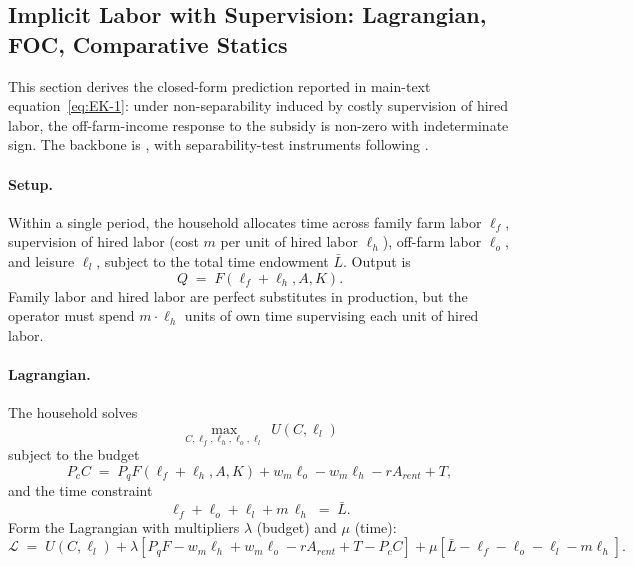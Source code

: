 \documentclass[11pt, a4paper]{article}
\begin{document}
\subsection{Implicit Labor with Supervision: Lagrangian, FOC, Comparative Statics}
\label{sec:appB-supervision}

This section derives the closed-form prediction reported in main-text
equation~\ref{eq:EK-1}: under non-separability induced by costly supervision of
hired labor, the off-farm-income response to the subsidy is non-zero with
indeterminate sign. The backbone is \citet{EswaranKotwal1986_supervision}, with
separability-test instruments following \citet{Benjamin1992_separation}.

\paragraph{Setup.} Within a single period, the household allocates time across
family farm labor $\ell_f$, supervision of hired labor (cost $m$ per unit of
hired labor $\ell_h$), off-farm labor $\ell_o$, and leisure $\ell_l$, subject to
the total time endowment $\bar L$. Output is
\begin{equation}
Q \;=\; F(\ell_f + \ell_h, A, K).
\label{eq:appB-EK-prod}
\end{equation}
Family labor and hired labor are perfect substitutes in production, but the
operator must spend $m \cdot \ell_h$ units of own time supervising each unit of
hired labor.

\paragraph{Lagrangian.} The household solves
\begin{equation}
\max_{C, \ell_f, \ell_h, \ell_o, \ell_l} \; U(C, \ell_l)
\label{eq:appB-EK-objective}
\end{equation}
subject to the budget
\begin{equation}
P_c C \;=\; P_q F(\ell_f + \ell_h, A, K) + w_m \ell_o - w_m \ell_h - r A_{rent} + T,
\label{eq:appB-EK-budget}
\end{equation}
and the time constraint
\begin{equation}
\ell_f + \ell_o + \ell_l + m\, \ell_h \;=\; \bar L.
\label{eq:appB-EK-time}
\end{equation}
Form the Lagrangian with multipliers $\lambda$ (budget) and $\mu$ (time):
\begin{equation}
\mathcal{L} \;=\; U(C, \ell_l) + \lambda \left[P_q F - w_m \ell_h + w_m \ell_o - r A_{rent} + T - P_c C\right] + \mu \left[\bar L - \ell_f - \ell_o - \ell_l - m \ell_h\right].
\label{eq:appB-EK-lagrangian}
\end{equation}
\end{document}
